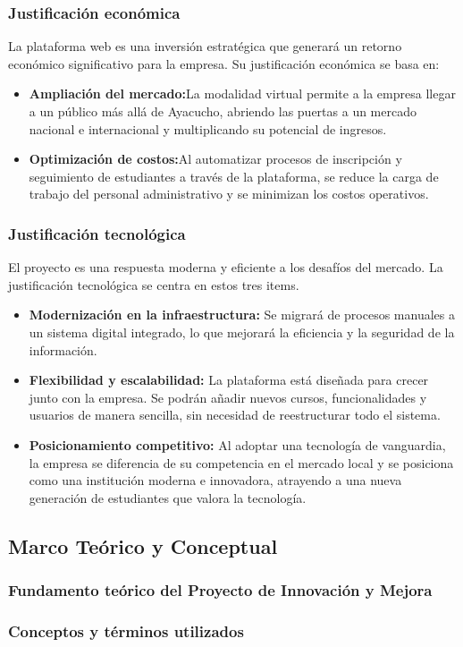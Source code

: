 \subsubsection{Justificación económica}
La plataforma web es una inversión estratégica que generará un retorno económico significativo para la empresa. Su justificación económica se basa en:
\begin{itemize}
	\item \textbf{Ampliación del mercado:}La modalidad virtual permite a la empresa llegar a un público más allá de Ayacucho, abriendo las puertas a un mercado nacional e internacional y multiplicando su potencial de ingresos.
\end{itemize}
\begin{itemize}
	\item \textbf{Optimización de costos:}Al automatizar procesos de inscripción y seguimiento de estudiantes a través de la plataforma, se reduce la carga de trabajo del personal administrativo y se minimizan los costos operativos.
\end{itemize}
\subsubsection{Justificación tecnológica}
El proyecto es una respuesta moderna y eficiente a los desafíos del mercado. La justificación tecnológica se centra en estos tres items.
\begin{itemize}
	\item \textbf{Modernización en la infraestructura:} Se migrará de procesos manuales a un sistema digital integrado, lo que mejorará la eficiencia y la seguridad de la información.
\end{itemize}
\begin{itemize}
	\item \textbf{Flexibilidad y escalabilidad:} La plataforma está diseñada para crecer junto con la empresa. Se podrán añadir nuevos cursos, funcionalidades y usuarios de manera sencilla, sin necesidad de reestructurar todo el sistema.
\end{itemize}
\begin{itemize}
	\item \textbf{Posicionamiento competitivo:} Al adoptar una tecnología de vanguardia, la empresa se diferencia de su competencia en el mercado local y se posiciona como una institución moderna e innovadora, atrayendo a una nueva generación de estudiantes que valora la tecnología.
\end{itemize}
\subsection{Marco Teórico y Conceptual}
\subsubsection{Fundamento teórico del Proyecto de Innovación y Mejora}
\subsubsection{Conceptos y términos utilizados}